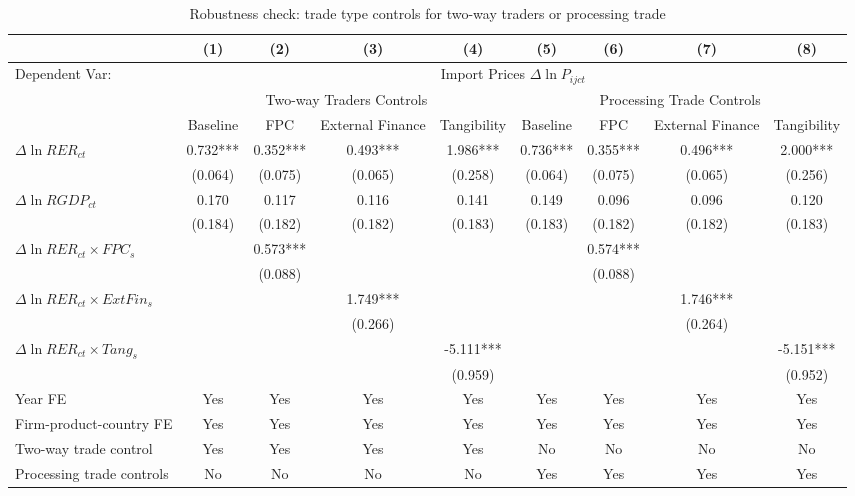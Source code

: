 \begin{table}
	\centering
	\caption{Robustness check: trade type controls for two-way traders or processing trade}
	\begin{threeparttable}
		\begin{tabular}{lcccccccc}
			\toprule
			& (1)   & (2)   & (3)   & (4) &  (5)  &  (6)   & (7)   & (8)\\
			\midrule
                Dependent Var: & \multicolumn{8}{c}{ Import Prices $\Delta \ln P_{ijct}$} \\
			& \multicolumn{4}{c}{Two-way Traders Controls} & \multicolumn{4}{c}{Processing Trade Controls}\\
			& Baseline & FPC & External Finance & Tangibility & Baseline & FPC & External Finance & Tangibility\\
			\midrule
			$\Delta \ln RER_{ct}$ & 0.732*** & 0.352*** & 0.493*** & 1.986*** & 0.736*** & 0.355*** & 0.496*** & 2.000*** \\
			& (0.064) & (0.075) & (0.065) & (0.258) & (0.064) & (0.075) & (0.065) & (0.256) \\
			$\Delta \ln RGDP_{ct}$ & 0.170 & 0.117 & 0.116 & 0.141 & 0.149 & 0.096 & 0.096 & 0.120 \\
			& (0.184) & (0.182) & (0.182) & (0.183) & (0.183) & (0.182) & (0.182) & (0.183) \\
			$\Delta \ln RER_{ct} \times FPC_{s}$ &   & 0.573*** &       &       &       & 0.574*** &       &  \\
			&   & (0.088) &       &       &       & (0.088) &       &  \\
			$\Delta \ln RER_{ct} \times ExtFin_{s}$ &    &       & 1.749*** &       &       &       & 1.746*** &  \\
			&     &       & (0.266) &       &       &       & (0.264) &  \\
			$\Delta \ln RER_{ct} \times Tang_{s}$ &     &       &       & -5.111*** &       &       &       & -5.151*** \\
			&     &       &       & (0.959) &       &       &       & (0.952) \\
                \midrule
			Year FE  &  Yes   & Yes   & Yes   & Yes &  Yes   & Yes   & Yes   & Yes\\
			Firm-product-country FE &  Yes   & Yes   & Yes   & Yes &  Yes   & Yes   & Yes   & Yes\\
			Two-way trade control &  Yes   & Yes   & Yes   & Yes & No & No & No & No\\
			Processing trade controls & No & No & No & No &  Yes   & Yes   & Yes  & Yes \\

\end{tabular}
\end{threeparttable}
\end{table}
